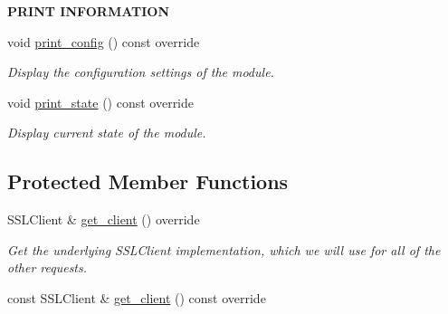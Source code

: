 \begin{Indent}{\bf P\+R\+I\+NT I\+N\+F\+O\+R\+M\+A\+T\+I\+ON}\par
\begin{DoxyCompactItemize}
\item 
void \hyperlink{class_loom___l_t_e_ae55b43c23da41b673720f5f160804e10}{print\+\_\+config} () const override
\begin{DoxyCompactList}\small\item\em Display the configuration settings of the module. \end{DoxyCompactList}\item 
void \hyperlink{class_loom___l_t_e_a2ca3566bf14efebc81a94d650ebc5236}{print\+\_\+state} () const override
\begin{DoxyCompactList}\small\item\em Display current state of the module. \end{DoxyCompactList}\end{DoxyCompactItemize}
\end{Indent}
\subsection*{Protected Member Functions}
\begin{DoxyCompactItemize}
\item 
S\+S\+L\+Client \& \hyperlink{class_loom___l_t_e_a7f4179803a9db2ccfd306bf37bfdf64e}{get\+\_\+client} () override
\begin{DoxyCompactList}\small\item\em Get the underlying S\+S\+L\+Client implementation, which we will use for all of the other requests. \end{DoxyCompactList}\item 
const S\+S\+L\+Client \& \hyperlink{class_loom___l_t_e_a844e09e0ae9b0c6f181d974171dfc10c}{get\+\_\+client} () const override
\end{DoxyCompactItemize}
